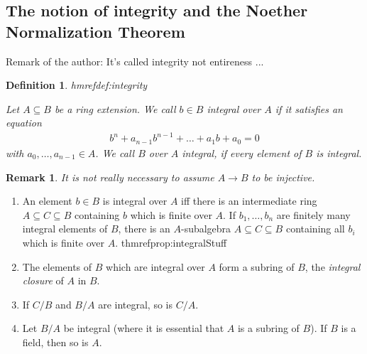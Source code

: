 \documentclass[DIV=14,parskip=full,pointednumbers]{scrartcl}
\newenvironment{rmnumerate}{\begin{enumerate}[label={\upshape(\roman*)}]}{\end{enumerate}}
\theoremstyle{cthm}
\theoremstyle{cvarthm}
\theoremstyle{cdef}
\newtheorem{defi}{Definition}[subsection]
\newtheorem{rem}{Remark}[subsection]
\newcommand{\lbl}[1]{
	\label{#1}
	\edef\dummy{\curthm}
	\expandafter\xdef\csname thmref#1\endcsname{\dummy}
}
\newcommand{\ldotspam}{,\ldots,}
\begin{document}
\subsection{The notion of integrity and the Noether Normalization Theorem}
Remark of the author: It's called integrity not entireness ...
\begin{defi}\lbl{def:integrity}
 Let $A\subseteq B$ be a ring extension. We call $b\in B$ \emph{integral} over $A$ if it satisfies an equation
 \begin{align*}
  b^n +a_{n-1}b^{n-1}+\ldots+a_1b+a_0 =0
 \end{align*}
 with $a_0,\ldots,a_{n-1}\in A$. We call $B$ over $A$ \emph{integral}, if every element of $B$ is integral.
\end{defi}
\begin{rem}
 It is not really necessary to assume $A\to B$ to be injective.
\end{rem}
\begin{prop}%
 \begin{rmnumerate}
  \item An element $b\in B$ is integral over $A$ iff there is an intermediate ring $A\subseteq C\subseteq B$ containing $b$ which is finite over $A$. If $b_1\ldotspam b_n$ are finitely many integral elements of $B$, there is an $A$-subalgebra $A\subseteq C\subseteq B$ containing all $b_i$ which is finite over $A$.\lbl{prop:integralStuff} %
  \item The elements of $B$ which are integral over $A$ form a subring of $B$, the \emph{integral closure} of $A$ in $B$.
  \item If $C/B$ and $B/A$ are integral, so is $C/A$.
  \item Let $B/A$ be integral (where it is essential that $A$ is a subring of $B$). If $B$ is a field, then so is $A$.
 \end{rmnumerate}

\end{prop}
\end{document}
